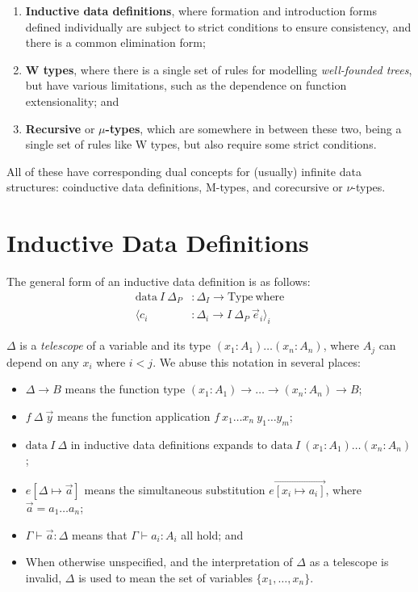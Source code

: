 \documentclass{report}
\newcommand{\const}[1]{\text{#1}}
\newcommand{\data}{\const{data}}
\newcommand{\Type}{\const{Type}}
\newcommand{\where}{\const{where}}
\begin{document}
\begin{enumerate}
    \item \textbf{Inductive data definitions}, where formation and introduction forms defined individually are subject to strict conditions to ensure consistency, and there is a common elimination form;
    \item \textbf{W types}, where there is a single set of rules for modelling \emph{well-founded trees}, but have various limitations, such as the dependence on function extensionality; and
    \item \textbf{Recursive} or \textbf{$\mu$-types}, which are somewhere in between these two, being a single set of rules like W types, but also require some strict conditions.
\end{enumerate}

All of these have corresponding dual concepts for (usually) infinite data structures: coinductive data definitions, M-types, and corecursive or $\nu$-types.

\section{Inductive Data Definitions}

The general form of an inductive data definition is as follows:
%
\begin{align*}
    \data ~ I ~ \Delta_P &: \Delta_I \to \Type ~ \where \\
    \langle c_i &: \Delta_i \to I ~ \Delta_P ~ \Vec{e}_i \rangle_i
\end{align*}

$\Delta$ is a \emph{telescope} of a variable and its type $(x_1: A_1) \dots (x_n: A_n)$, where $A_j$ can depend on any $x_i$ where $i < j$. We abuse this notation in several places:
%
\begin{itemize}
    \item $\Delta \to B$ means the function type $(x_1: A_1) \to \dots \to (x_n: A_n) \to B$;
    \item $f ~ \Delta ~ \Vec{y}$ means the function application $f ~ x_1 \dots x_n ~ y_1 \dots y_m$;
    \item $\data ~ I ~ \Delta$ in inductive data definitions expands to $\data ~ I ~ (x_1: A_1) \dots (x_n: A_n)$;
    \item $e[\Delta \mapsto \Vec{a}]$ means the simultaneous substitution $e\overrightarrow{[x_i \mapsto a_i]}$, where $\Vec{a} = a_1 \dots a_n$;
    \item $\Gamma \vdash \Vec{a} : \Delta$ means that $\Gamma \vdash a_i: A_i$ all hold; and
    \item When otherwise unspecified, and the interpretation of $\Delta$ as a telescope is invalid, $\Delta$ is used to mean the set of variables $\{ x_1, \dots, x_n \}$.
\end{itemize}
\end{document}
